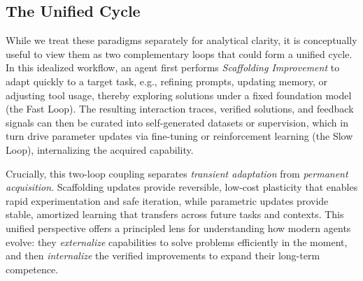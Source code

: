 \subsection{The Unified Cycle}
\label{subsec:The_Unified_Cycle}

While we treat these paradigms separately for analytical clarity, it is conceptually useful to view them as two complementary loops that could form a unified cycle. In this idealized workflow, an agent first performs \textit{Scaffolding Improvement} to adapt quickly to a target task, e.g., refining prompts, updating memory, or adjusting tool usage, thereby exploring solutions under a fixed foundation model (the Fast Loop). The resulting interaction traces, verified solutions, and feedback signals can then be curated into self-generated datasets or supervision, which in turn drive parameter updates via fine-tuning or reinforcement learning (the Slow Loop), internalizing the acquired capability.

Crucially, this two-loop coupling separates \emph{transient adaptation} from \emph{permanent acquisition}. Scaffolding updates provide reversible, low-cost plasticity that enables rapid experimentation and safe iteration, while parametric updates provide stable, amortized learning that transfers across future tasks and contexts. This unified perspective offers a principled lens for understanding how modern agents evolve: they \emph{externalize} capabilities to solve problems efficiently in the moment, and then \emph{internalize} the verified improvements to expand their long-term competence.
